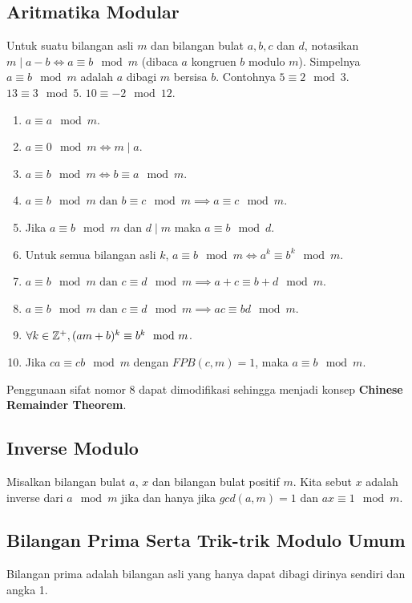 \documentclass[11pt]{scrartcl}
\begin{document}
        \subsection{Aritmatika Modular}
        Untuk suatu bilangan asli $m$ dan bilangan bulat $a,b,c$ dan $d$, notasikan $m\mid a-b \iff a \equiv b \mod m$ (dibaca $a$ kongruen $b$ modulo $m$). Simpelnya $a \equiv b \mod m$ adalah $a$ dibagi $m$ bersisa $b$. Contohnya $5 \equiv 2 \mod 3$. $13 \equiv 3 \mod 5$. $10 \equiv -2 \mod 12$.
        \begin{enumerate}
            \item $a \equiv a \mod m$.
            \item $a \equiv 0 \mod m \iff m\mid a$.
            \item $a \equiv b \mod m \iff b \equiv a \mod m$.
            \item $a \equiv b \mod m \text{ dan } b \equiv c \mod m \implies a \equiv c \mod m$.
            \item Jika $a \equiv b \mod m$ dan $d\mid m$ maka $a \equiv b \mod d$.
            \item Untuk semua bilangan asli $k$, $a \equiv b \mod m \iff a^k \equiv b^k \mod m$.
            \item $a \equiv b \mod m \text{ dan } c \equiv d \mod m \implies a+c \equiv b+d \mod m$.
            \item $a \equiv b \mod m \text{ dan } c \equiv d \mod m \implies ac \equiv bd \mod m$.
            \item $\forall k\in \mathbb Z^+, (am+b)^k \equiv b^k \mod m$.
            \item Jika $ca \equiv cb \mod m$ dengan $FPB(c,m)=1$, maka $a \equiv b \mod m$.
        \end{enumerate}
        
        Penggunaan sifat nomor 8 dapat dimodifikasi sehingga menjadi konsep \textbf{Chinese Remainder Theorem}.
        
    \subsection{Inverse Modulo}
    Misalkan bilangan bulat $a$, $x$ dan bilangan bulat positif $m$. Kita sebut $x$ adalah inverse dari $a \mod m$ jika dan hanya jika $gcd(a,m)=1$ dan $ax \equiv 1 \mod m$.
    
    \subsection{Bilangan Prima Serta Trik-trik Modulo Umum}
    Bilangan prima adalah bilangan asli yang hanya dapat dibagi dirinya sendiri dan angka 1. 
    
\end{document}
